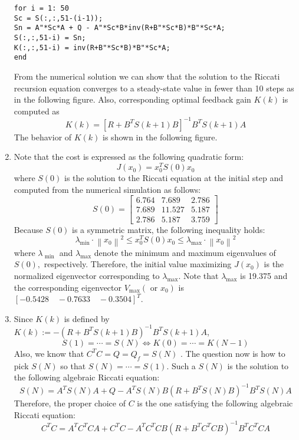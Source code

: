 \documentclass[10pt,a4paper,oneside]{article}
\begin{document}
\begin{enumerate}
\begin{lstlisting}
for i = 1: 50
Sc = S(:,:,51-(i-1));
Sn = A"*Sc*A + Q - A"*Sc*B*inv(R+B"*Sc*B)*B"*Sc*A;
S(:,:,51-i) = Sn;
K(:,:,51-i) = inv(R+B"*Sc*B)*B"*Sc*A;
end
\end{lstlisting}
From the numerical solution we can show that the solution to the Riccati recursion equation converges to a steady-state value in fewer than 10 steps as in the following figure.
Also, corresponding optimal feedback gain $K(k)$ is computed as
\[
K(k)=\left[R+B^{T} S(k+1) B\right]^{-1} B^{T} S(k+1) A
\]
The behavior of $K(k)$ is shown in the following figure.
\item Note that the cost is expressed as the following quadratic form:
\[
J\left(x_{0}\right)=x_{0}^{T} S(0) x_{0}
\]
where $S(0)$ is the solution to the Riccati equation at the initial step and computed from the numerical simulation as follows:
\[
S(0)=\left[\begin{array}{ccc}{6.764} & {7.689} & {2.786} \\ {7.689} & {11.527} & {5.187} \\ {2.786} & {5.187} & {3.759}\end{array}\right]
\]
Because $S(0)$ is a symmetric matrix, the following inequality holds:
\[
\lambda_{\min } \cdot\left\|x_{0}\right\|^{2} \leq x_{0}^{T} S(0) x_{0} \leq \lambda_{\max } \cdot\left\|x_{0}\right\|^{2}
\]
where $\lambda_{\text { min }}$ and $\lambda_{\max }$ denote the minimum and maximum eigenvalues of $S(0),$ respectively. Therefore, the initial value maximizing $J\left(x_{0}\right)$ is the normalized eigenvector corresponding to $\lambda_{\max } .$ Note that $\lambda_{\max }$ is 19.375 and the corresponding eigenvector $V_{\max }\left(\text { or } x_{0}\right)$ is $[-0.5428 \quad-0.7633 \quad-0.3504]^{T}$.
\item Since $K(k)$ is defined by $K(k) :=-\left(R+B^{T} S(k+1) B\right)^{-1} B^{T} S(k+1) A$,
\[
S(1)=\cdots=S(N) \Leftrightarrow K(0)=\cdots=K(N-1)
\]
Also, we know that $C^{T} C=Q=Q_{f}=S(N)$ . The question now is how to pick $S(N)$ so that
$S(N)=\cdots=S(1) .$ Such a $S(N)$ is the solution to the following algebraic Riccati equation:
\[
S(N)=A^{T} S(N) A+Q-A^{T} S(N) B\left(R+B^{T} S(N) B\right)^{-1} B^{T} S(N) A
\]
Therefore, the proper choice of $C$ is the one satisfying the following algebraic Riccati equation:
\[
C^{T} C=A^{T} C^{T} C A+C^{T} C-A^{T} C^{T} C B\left(R+B^{T} C^{T} C B\right)^{-1} B^{T} C^{T} C A
\]
\end{enumerate}
\end{document}
